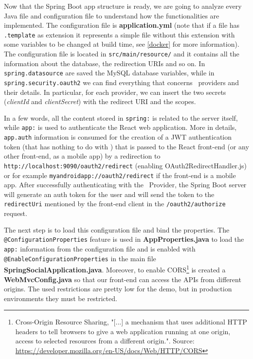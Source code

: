 \noindent Now that the Spring Boot app structure is ready, we are going to analyze every Java file and configuration file to understand how the functionalities are implemented. The configuration file is \textbf{application.yml} (note that if a file has \texttt{.template} as extension it represents a simple file without this extension with some variables to be changed at build time, see \ref{docker} for more information). The configuration file is located in \texttt{src/main/resource/} and it contains all the information about the database, the redirection URIs and so on. In \texttt{spring.datasource} are saved the MySQL database variables, while in \texttt{spring.security.oauth2} we can find everything that concerns \oauth\ providers and their details. In particular, for each provider, we can insert the two secrets (\textit{clientId} and \textit{clientSecret}) with the redirect URI and the scopes.

In a few words, all the content stored in \texttt{spring:} is related to the server itself, while \texttt{app:} is used to authenticate the React web application. More in details, \texttt{app.auth} information is consumed for the creation of a JWT authentication token (that has nothing to do with \oauth) that is passed to the React front-end (or any other front-end, as a mobile app) by a redirection to \\ \texttt{http://localhost:9090/oauth2/redirect} (enabling OAuth2RedirectHandler.js) or for example \texttt{myandroidapp://oauth2/redirect} if the front-end is a mobile app.
After successfully authenticating with the \oauth\ Provider, the Spring Boot server will generate an auth token for the user and will send the token to the \texttt{redirectUri} mentioned by the front-end client in the \texttt{/oauth2/authorize} request. 

The next step is to load this configuration file and bind the properties. The \\ \texttt{@ConfigurationProperties} feature is used in \textbf{AppProperties.java} to load the \texttt{app:} information from the configuration file and is enabled with  \texttt{@EnableConfigurationProperties} in the main file \textbf{SpringSocialApplication.java}. Moreover, to enable CORS\footnote{Cross-Origin Resource Sharing, "[...] a mechanism that uses additional HTTP headers to tell browsers to give a web application running at one origin, access to selected resources from a different origin.". Source: \url{https://developer.mozilla.org/en-US/docs/Web/HTTP/CORS}} is created a \textbf{WebMvcConfig.java}  so that our front-end can access the APIs from different origins. The used restrictions are pretty low for the demo, but in production environments they must be restricted.

